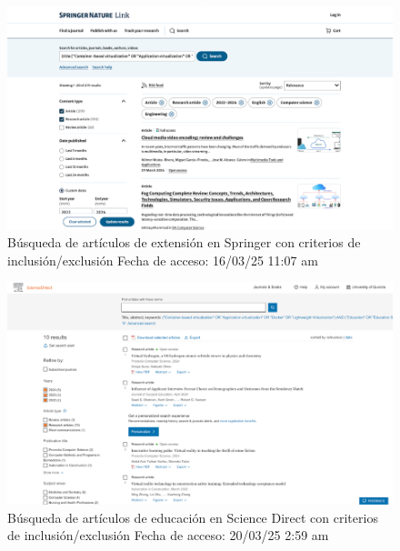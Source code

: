 \FloatBarrier
\begin{figure}[htbp]
    \centering
    \includegraphics[width=\textwidth,keepaspectratio]{apendices/BD/criterios/Springer-ind.png}
    \caption{Búsqueda de artículos de extensión en Springer con criterios de inclusión/exclusión
    Fecha de acceso: 16/03/25 11:07 am
    }\label{fig:busqueda24}
\end{figure}
\FloatBarrier
\begin{figure}[htbp]
    \centering
    \includegraphics[width=\textwidth,keepaspectratio]{apendices/BD/criterios/SD-ed.png}
    \caption{Búsqueda de artículos de educación en Science Direct con criterios de inclusión/exclusión
    Fecha de acceso: 20/03/25 2:59 am
    }\label{fig:busqueda25}
\end{figure}
\FloatBarrier
